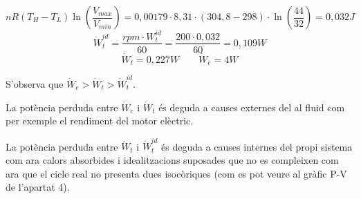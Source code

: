 \documentclass[a4paper]{article}
\begin{document}
$$
nR(T_H - T_L)\ln\left(\frac{V_{max}}{V_{min}}\right) = 
0,00179·8,31·(304,8 - 298)·\ln\left(\frac{44}{32}\right) = 0,032 J
$$
$$
\dot{W}_t^{id} = \frac{rpm·W_t^{id}}{60} = \frac{200·0,032}{60} = 0,109 W
$$
$$
\dot{W}_t = 0,227 W \qquad \dot{W}_e = 4 W
$$

S'observa que $ \dot{W}_e > \dot{W}_t > \dot{W}_t^{id} $. 

La potència perduda entre $\dot{W}_e$ i $\dot{W}_t$ és deguda a causes externes del al fluid com per exemple el rendiment del motor elèctric.

La potència perduda entre $\dot{W}_t$ i $\dot{W}_t^{id}$ és deguda a causes internes del propi sistema com ara calors absorbides i idealitzacions suposades que no es compleixen com ara que el cicle real no presenta dues isocòriques (com es pot veure al gràfic P-V de l'apartat 4).
	
	
	
\end{document}

